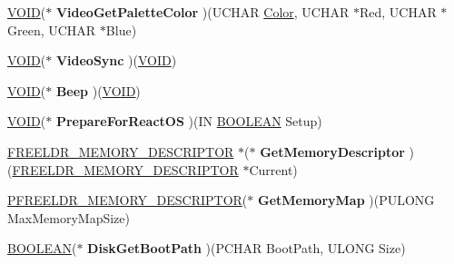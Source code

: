\begin{DoxyCompactItemize}
\hyperlink{interfacevoid}{V\+O\+ID}($\ast$ {\bfseries Video\+Get\+Palette\+Color} )(U\+C\+H\+AR \hyperlink{struct_color}{Color}, U\+C\+H\+AR $\ast$Red, U\+C\+H\+AR $\ast$Green, U\+C\+H\+AR $\ast$Blue)
\item 
\mbox{\label{structtag_m_a_c_h_v_t_b_l_abfca5d7ced87d873ff67e9a943675d46}} 
\hyperlink{interfacevoid}{V\+O\+ID}($\ast$ {\bfseries Video\+Sync} )(\hyperlink{interfacevoid}{V\+O\+ID})
\item 
\mbox{\label{structtag_m_a_c_h_v_t_b_l_a82871f911df5f24ecd51cedbe7a3bc6e}} 
\hyperlink{interfacevoid}{V\+O\+ID}($\ast$ {\bfseries Beep} )(\hyperlink{interfacevoid}{V\+O\+ID})
\item 
\mbox{\label{structtag_m_a_c_h_v_t_b_l_a8db42c1b9ee126e9e5aaef793bfe50f7}} 
\hyperlink{interfacevoid}{V\+O\+ID}($\ast$ {\bfseries Prepare\+For\+React\+OS} )(IN \hyperlink{_processor_bind_8h_a112e3146cb38b6ee95e64d85842e380a}{B\+O\+O\+L\+E\+AN} Setup)
\item 
\mbox{\label{structtag_m_a_c_h_v_t_b_l_a06e770669d785332e0a67884e80d5384}} 
\hyperlink{struct___f_r_e_e_l_d_r___m_e_m_o_r_y___d_e_s_c_r_i_p_t_o_r}{F\+R\+E\+E\+L\+D\+R\+\_\+\+M\+E\+M\+O\+R\+Y\+\_\+\+D\+E\+S\+C\+R\+I\+P\+T\+OR} $\ast$($\ast$ {\bfseries Get\+Memory\+Descriptor} )(\hyperlink{struct___f_r_e_e_l_d_r___m_e_m_o_r_y___d_e_s_c_r_i_p_t_o_r}{F\+R\+E\+E\+L\+D\+R\+\_\+\+M\+E\+M\+O\+R\+Y\+\_\+\+D\+E\+S\+C\+R\+I\+P\+T\+OR} $\ast$Current)
\item 
\mbox{\label{structtag_m_a_c_h_v_t_b_l_a7d354f68a1ead75289f87a9cfec273fe}} 
\hyperlink{struct___f_r_e_e_l_d_r___m_e_m_o_r_y___d_e_s_c_r_i_p_t_o_r}{P\+F\+R\+E\+E\+L\+D\+R\+\_\+\+M\+E\+M\+O\+R\+Y\+\_\+\+D\+E\+S\+C\+R\+I\+P\+T\+OR}($\ast$ {\bfseries Get\+Memory\+Map} )(P\+U\+L\+O\+NG Max\+Memory\+Map\+Size)
\item 
\mbox{\label{structtag_m_a_c_h_v_t_b_l_abd0770ef9c0c4b5d07586837aeee0163}} 
\hyperlink{_processor_bind_8h_a112e3146cb38b6ee95e64d85842e380a}{B\+O\+O\+L\+E\+AN}($\ast$ {\bfseries Disk\+Get\+Boot\+Path} )(P\+C\+H\+AR Boot\+Path, U\+L\+O\+NG Size)
\item 
\mbox{\label{structtag_m_a_c_h_v_t_b_l_a71710f54035160968b66d35f61b0caef}} 

\end{DoxyCompactItemize}
